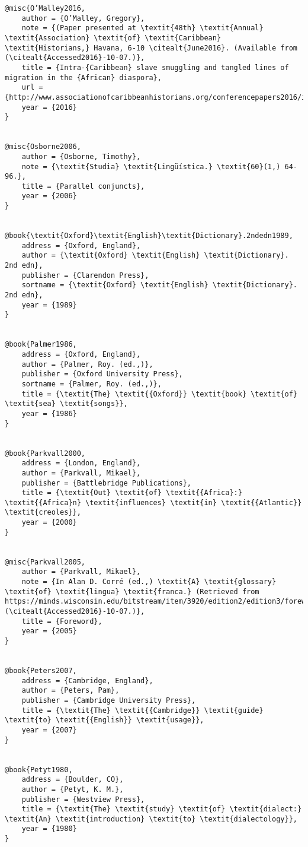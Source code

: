 \begin{verbatim}
@misc{O’Malley2016,
	author = {O’Malley, Gregory},
	note = {(Paper presented at \textit{48th} \textit{Annual} \textit{Association} \textit{of} \textit{Caribbean} \textit{Historians,} Havana, 6-10 \citealt{June2016}. (Available from  (\citealt{Accessed2016}-10-07.)},
	title = {Intra-{Caribbean} slave smuggling and tangled lines of migration in the {African} diaspora},
	url = {http://www.associationofcaribbeanhistorians.org/conferencepapers2016/index.htm)},
	year = {2016}
}


@misc{Osborne2006,
	author = {Osborne, Timothy},
	note = {\textit{Studia} \textit{Lingüística.} \textit{60}(1,) 64-96.},
	title = {Parallel conjuncts},
	year = {2006}
}


@book{\textit{Oxford}\textit{English}\textit{Dictionary}.2ndedn1989,
	address = {Oxford, England},
	author = {\textit{Oxford} \textit{English} \textit{Dictionary}. 2nd edn},
	publisher = {Clarendon Press},
	sortname = {\textit{Oxford} \textit{English} \textit{Dictionary}. 2nd edn},
	year = {1989}
}


@book{Palmer1986,
	address = {Oxford, England},
	author = {Palmer, Roy. (ed.,)},
	publisher = {Oxford University Press},
	sortname = {Palmer, Roy. (ed.,)},
	title = {\textit{The} \textit{{Oxford}} \textit{book} \textit{of} \textit{sea} \textit{songs}},
	year = {1986}
}


@book{Parkvall2000,
	address = {London, England},
	author = {Parkvall, Mikael},
	publisher = {Battlebridge Publications},
	title = {\textit{Out} \textit{of} \textit{{Africa}:} \textit{{Africa}n} \textit{influences} \textit{in} \textit{{Atlantic}} \textit{creoles}},
	year = {2000}
}


@misc{Parkvall2005,
	author = {Parkvall, Mikael},
	note = {In Alan D. Corré (ed.,) \textit{A} \textit{glossary} \textit{of} \textit{lingua} \textit{franca.} (Retrieved from https://minds.wisconsin.edu/bitstream/item/3920/edition2/edition3/foreword.htm) (\citealt{Accessed2016}-10-07.)},
	title = {Foreword},
	year = {2005}
}


@book{Peters2007,
	address = {Cambridge, England},
	author = {Peters, Pam},
	publisher = {Cambridge University Press},
	title = {\textit{The} \textit{{Cambridge}} \textit{guide} \textit{to} \textit{{English}} \textit{usage}},
	year = {2007}
}


@book{Petyt1980,
	address = {Boulder, CO},
	author = {Petyt, K. M.},
	publisher = {Westview Press},
	title = {\textit{The} \textit{study} \textit{of} \textit{dialect:} \textit{An} \textit{introduction} \textit{to} \textit{dialectology}},
	year = {1980}
}



\end{verbatim}
